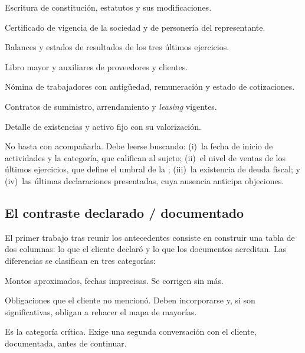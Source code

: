 \begin{checklist}
  \item Escritura de constitución, estatutos y sus modificaciones.
  \item Certificado de vigencia de la sociedad y de personería del representante.
  \item Balances y estados de resultados de los tres últimos ejercicios.
  \item Libro mayor y auxiliares de proveedores y clientes.
  \item Nómina de trabajadores con antigüedad, remuneración y estado de cotizaciones.
  \item Contratos de suministro, arrendamiento y \emph{leasing} vigentes.
  \item Detalle de existencias y activo fijo con su valorización.
\end{checklist}

\begin{foco}
No basta con acompañarla. Debe leerse buscando: (i)~la fecha de inicio de actividades y
la categoría, que califican al sujeto; (ii)~el nivel de ventas de los últimos ejercicios,
que define el umbral de la \Lpyme{}; (iii)~la existencia de deuda fiscal; y (iv)~las
últimas declaraciones presentadas, cuya ausencia anticipa objeciones.
\end{foco}

\bloqueFocos

\subsection{El contraste declarado / documentado}

El primer trabajo tras reunir los antecedentes consiste en construir una tabla de dos
columnas: lo que el cliente declaró y lo que los documentos acreditan. Las diferencias
se clasifican en tres categorías:

\begin{description}[leftmargin=0pt,style=nextline,font=\sffamily\bfseries]
  \item[Diferencias de memoria] Montos aproximados, fechas imprecisas. Se corrigen sin
  más.

  \item[Deudas omitidas] Obligaciones que el cliente no mencionó. Deben incorporarse y,
  si son significativas, obligan a rehacer el mapa de mayorías.

  \item[Activos o actos omitidos] Es la categoría crítica. Exige una segunda conversación
  con el cliente, documentada, antes de continuar.
\end{description}

